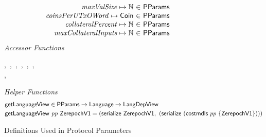 \begin{figure*}[htb]
\begin{equation*}
\begin{array}{r@{~\in~}l@{\qquad}r}
        \var{maxValSize} \mapsto \N & \PParams \\
        \var{coinsPerUTxOWord} \mapsto \Coin & \PParams \\
        \var{collateralPercent} \mapsto \N & \PParams \\
        \var{maxCollateralInputs} \mapsto \N & \PParams \\
      \end{array}
  \end{equation*}
  \emph{Accessor Functions}
  \begin{center}
    ,~,~,~,~,~,\\
    ,~
  \end{center}
  \emph{Helper Functions}
  \begin{align*}
    & \mathsf{getLanguageView} \in \mathsf{PParams} \to \mathsf{Language} \to \mathsf{LangDepView} \\
    & \mathsf{getLanguageView}~\mathit{pp}~\mathsf{ZerepochV1} = (\mathsf{serialize}~\mathsf{ZerepochV1}, ~ (\mathsf{serialize}~(\mathsf{costmdls}~{pp}~\{\mathsf{ZerepochV1}\})))
  \end{align*}
  \caption{Definitions Used in Protocol Parameters}
  \label{fig:defs:protocol-parameters}
\end{figure*}
